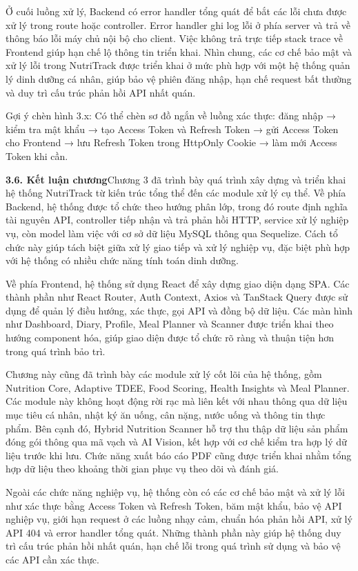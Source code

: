 Ở cuối luồng xử lý, Backend có error handler tổng quát để bắt các lỗi chưa được xử lý trong route hoặc controller. Error handler ghi log lỗi ở phía server và trả về thông báo lỗi máy chủ nội bộ cho client. Việc không trả trực tiếp stack trace về Frontend giúp hạn chế lộ thông tin triển khai. Nhìn chung, các cơ chế bảo mật và xử lý lỗi trong NutriTrack được triển khai ở mức phù hợp với một hệ thống quản lý dinh dưỡng cá nhân, giúp bảo vệ phiên đăng nhập, hạn chế request bất thường và duy trì cấu trúc phản hồi API nhất quán.

Gợi ý chèn hình 3.x: Có thể chèn sơ đồ ngắn về luồng xác thực: đăng nhập → kiểm tra mật khẩu → tạo Access Token và Refresh Token → gửi Access Token cho Frontend → lưu Refresh Token trong HttpOnly Cookie → làm mới Access Token khi cần.

\textbf{3.6. Kết luận chương}Chương 3 đã trình bày quá trình xây dựng và triển khai hệ thống NutriTrack từ kiến trúc tổng thể đến các module xử lý cụ thể. Về phía Backend, hệ thống được tổ chức theo hướng phân lớp, trong đó route định nghĩa tài nguyên API, controller tiếp nhận và trả phản hồi HTTP, service xử lý nghiệp vụ, còn model làm việc với cơ sở dữ liệu MySQL thông qua Sequelize. Cách tổ chức này giúp tách biệt giữa xử lý giao tiếp và xử lý nghiệp vụ, đặc biệt phù hợp với hệ thống có nhiều chức năng tính toán dinh dưỡng.

Về phía Frontend, hệ thống sử dụng React để xây dựng giao diện dạng SPA. Các thành phần như React Router, Auth Context, Axios và TanStack Query được sử dụng để quản lý điều hướng, xác thực, gọi API và đồng bộ dữ liệu. Các màn hình như Dashboard, Diary, Profile, Meal Planner và Scanner được triển khai theo hướng component hóa, giúp giao diện được tổ chức rõ ràng và thuận tiện hơn trong quá trình bảo trì.

Chương này cũng đã trình bày các module xử lý cốt lõi của hệ thống, gồm Nutrition Core, Adaptive TDEE, Food Scoring, Health Insights và Meal Planner. Các module này không hoạt động rời rạc mà liên kết với nhau thông qua dữ liệu mục tiêu cá nhân, nhật ký ăn uống, cân nặng, nước uống và thông tin thực phẩm. Bên cạnh đó, Hybrid Nutrition Scanner hỗ trợ thu thập dữ liệu sản phẩm đóng gói thông qua mã vạch và AI Vision, kết hợp với cơ chế kiểm tra hợp lý dữ liệu trước khi lưu. Chức năng xuất báo cáo PDF cũng được triển khai nhằm tổng hợp dữ liệu theo khoảng thời gian phục vụ theo dõi và đánh giá.

Ngoài các chức năng nghiệp vụ, hệ thống còn có các cơ chế bảo mật và xử lý lỗi như xác thực bằng Access Token và Refresh Token, băm mật khẩu, bảo vệ API nghiệp vụ, giới hạn request ở các luồng nhạy cảm, chuẩn hóa phản hồi API, xử lý API 404 và error handler tổng quát. Những thành phần này giúp hệ thống duy trì cấu trúc phản hồi nhất quán, hạn chế lỗi trong quá trình sử dụng và bảo vệ các API cần xác thực.

